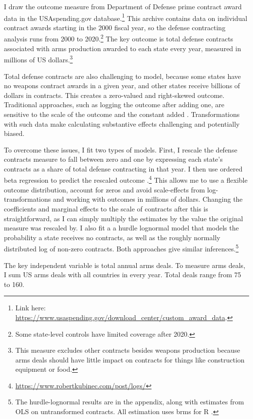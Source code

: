 \documentclass[12pt]{article}
\begin{document}
I draw the outcome measure from Department of Defense prime contract award data in the USAspending.gov database.\footnote{Link here: \url{https://www.usaspending.gov/download_center/custom_award_data}.} 
This archive contains data on individual contract awards starting in the 2000 fiscal year, so the defense contracting analysis runs from 2000 to 2020.\footnote{Some state-level controls have limited coverage after 2020.}
The key outcome is total defense contracts associated with arms production awarded to each state every year, measured in millions of US dollars.\footnote{This measure excludes other contracts besides weapons production because arms deals should have little impact on contracts for things like construction equipment or food.}


Total defense contracts are also challenging to model, because some states have no weapons contract awards in a given year, and other states receive billions of dollars in contracts. 
This creates a zero-valued and right-skewed outcome. 
Traditional approaches, such as logging the outcome after adding one, are sensitive to the scale of the outcome and the constant added \citep{ChenRoth2022, MullahyNorton2022}. 
Transformations with such data make calculating substantive effects challenging and potentially biased. 


To overcome these issues, I fit two types of models.
First, I rescale the defense contracts measure to fall between zero and one by expressing each state's contracts as a share of total defense contracting in that year.
I then use ordered beta regression to predict the rescaled outcome \citep{Kubinec2022}.\footnote{\url{https://www.robertkubinec.com/post/logs/}} 
This allows me to use a flexible outcome distribution, account for zeros and avoid scale-effects from log-transformations and working with outcomes in millions of dollars. 
Changing the coefficients and marginal effects to the scale of contracts after this is straightforward, as I can simply multiply the estimates by the value the original measure was rescaled by.
I also fit a a hurdle lognormal model that models the probability a state receives no contracts, as well as the roughly normally distributed log of non-zero contracts. 
Both approaches give similar inferences.\footnote{The hurdle-lognormal results are in the appendix, along with estimates from OLS on untransformed contracts. All estimation uses brms for \textsf{R} \citep{Buerkner2017}.} 


The key independent variable is total annual arms deals.  
To measure arms deals, I sum US arms deals with all countries in every year. 
Total deals range from 75 to 160. 
\end{document}
